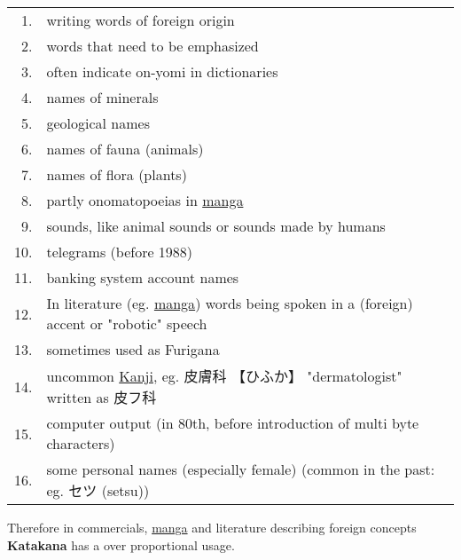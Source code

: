 \begin{tabular}{rp{15cm}}
1.& writing words of foreign origin\\
2.& words that need to be emphasized\\
3. &often indicate on-yomi in dictionaries\\
4.& names of minerals \\
5.& geological names \\
6.& names of fauna (animals)\\
7.& names of flora (plants)\\
8.& partly onomatopoeias in \hyperref[sec:Manga]{manga}\\
9.& sounds, like animal sounds or sounds made by humans\\
10.& telegrams (before 1988)\\
11.& banking system account names\\
12.& In literature (eg. \hyperref[sec:Manga]{manga}) words being spoken in a
(foreign) accent or "robotic" speech\\
13. &sometimes used as Furigana\\
14. & uncommon \hyperref[sec:Kanji]{Kanji}, eg. {皮膚科} {【ひふか】} 
"dermatologist" written as {皮フ科}\\
15.& computer output (in 80th, before introduction of multi byte characters)\\
16. &some personal names (especially female) (common in the past: eg.
セツ (setsu))\\

\end{tabular}

\medskip


Therefore in commercials, \hyperref[sec:Manga]{manga} and literature describing
foreign concepts \textbf{Katakana} has a over proportional usage.



%

